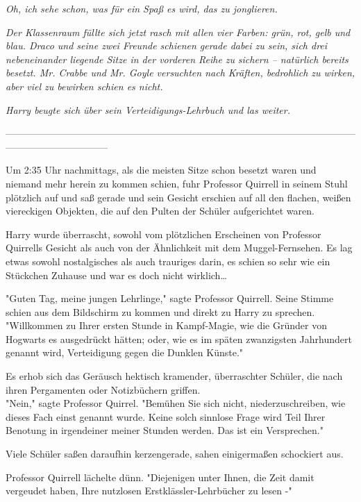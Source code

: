 {\emph{\emph{Oh, ich sehe schon, was für ein Spaß es wird, das zu jonglieren.}}

\emph{Der Klassenraum füllte sich jetzt rasch mit allen vier Farben: grün, rot, gelb und blau. Draco und seine zwei Freunde schienen gerade dabei zu sein, sich drei nebeneinander liegende Sitze in der vorderen Reihe zu} \emph{sichern -- natürlich bereits besetzt. Mr. Crabbe und Mr. Goyle versuchten nach Kräften, bedrohlich zu wirken, aber viel zu bewirken schien es nicht.}

\emph{Harry beugte sich über sein Verteidigungs-Lehrbuch und las weiter.}

--------------------------------------------------------------------------------------------------------------------------------------------

Um 2:35 Uhr nachmittags, als die meisten Sitze schon besetzt waren und niemand mehr herein zu kommen schien, fuhr Professor Quirrell in seinem Stuhl plötzlich auf und saß gerade und sein Gesicht erschien auf all den flachen, weißen viereckigen Objekten, die auf den Pulten der Schüler aufgerichtet waren.

Harry wurde überrascht, sowohl vom plötzlichen Erscheinen von Professor Quirrells Gesicht als auch von der Ähnlichkeit mit dem Muggel-Fernsehen. Es lag etwas sowohl nostalgisches als auch trauriges darin, es schien so sehr wie ein Stückchen Zuhause und war es doch nicht wirklich…

"Guten Tag, meine jungen Lehrlinge," sagte Professor Quirrell. Seine Stimme schien aus dem Bildschirm zu kommen und direkt zu Harry zu sprechen. "Willkommen zu Ihrer ersten Stunde in Kampf-Magie, wie die Gründer von Hogwarts es ausgedrückt hätten; oder, wie es im späten zwanzigsten Jahrhundert genannt wird, Verteidigung gegen die Dunklen Künste."

Es erhob sich das Geräusch hektisch kramender, überraschter Schüler, die nach ihren Pergamenten oder Notizbüchern griffen.\\ "Nein," sagte Professor Quirrel. "Bemühen Sie sich nicht, niederzuschreiben, wie dieses Fach einst genannt wurde. Keine solch sinnlose Frage wird Teil Ihrer Benotung in irgendeiner meiner Stunden werden. Das ist ein Versprechen."

Viele Schüler saßen daraufhin kerzengerade, sahen einigermaßen schockiert aus.

Professor Quirrell lächelte dünn. "Diejenigen unter Ihnen, die Zeit damit vergeudet haben, Ihre nutzlosen Erstklässler-Lehrbücher zu lesen -"

}
